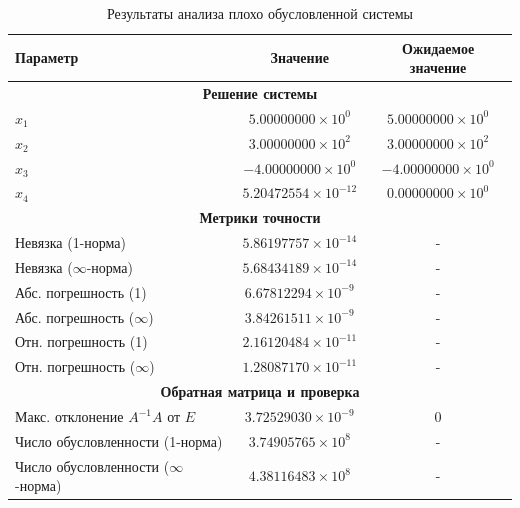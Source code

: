\documentclass[12pt, a4paper]{article}
\begin{document}
\begin{table}[h]
\centering
\caption{Результаты анализа плохо обусловленной системы}
\begin{tabular}{|l|c|c|}
\hline
\textbf{Параметр} & \textbf{Значение} & \textbf{Ожидаемое значение} \\
\hline
\multicolumn{3}{|c|}{\textbf{Решение системы}} \\
\hline
$x_1$ & $5.00000000 \times 10^0$ & $5.00000000 \times 10^0$ \\
$x_2$ & $3.00000000 \times 10^2$ & $3.00000000 \times 10^2$ \\
$x_3$ & $-4.00000000 \times 10^0$ & $-4.00000000 \times 10^0$ \\
$x_4$ & $5.20472554 \times 10^{-12}$ & $0.00000000 \times 10^0$ \\
\hline
\multicolumn{3}{|c|}{\textbf{Метрики точности}} \\
\hline
Невязка (1-норма) & $5.86197757 \times 10^{-14}$ & - \\
Невязка ($\infty$-норма) & $5.68434189 \times 10^{-14}$ & - \\
Абс. погрешность (1) & $6.67812294 \times 10^{-9}$ & - \\
Абс. погрешность ($\infty$) & $3.84261511 \times 10^{-9}$ & - \\
Отн. погрешность (1) & $2.16120484 \times 10^{-11}$ & - \\
Отн. погрешность ($\infty$) & $1.28087170 \times 10^{-11}$ & - \\
\hline
\multicolumn{3}{|c|}{\textbf{Обратная матрица и проверка}} \\
\hline
Макс. отклонение $A^{-1}A$ от $E$& $3.72529030 \times 10^{-9}$ & 0 \\
Число обусловленности (1-норма) & $3.74905765 \times 10^8$ & - \\
Число обусловленности ($\infty$-норма) & $4.38116483 \times 10^8$ & - \\
\hline
\end{tabular}
\end{table}
\end{document}
